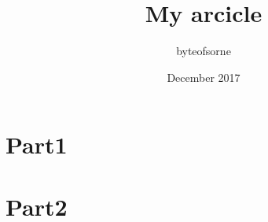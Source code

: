 \documentclass{article}
\title{My arcicle}
\author{byteofsorne}
\date{December 2017}
\begin{document}
\maketitle

\section{Part1}

\section{Part2}

\end{document}
